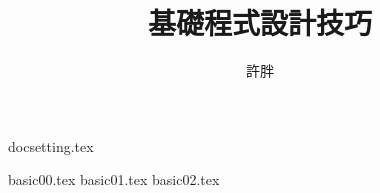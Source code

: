 \documentclass[12pt,a4paper,oneside]{article}
\begin{document}
\begin{CJK}{UTF8}{bkai}

{docsetting.tex}

\title{基礎程式設計技巧}
\author{許胖}

\begin{multicols}{2}
\tableofcontents
\end{multicols}

{basic00.tex}
{basic01.tex}
{basic02.tex}

\printindex

\clearpage
\end{CJK}
\end{document}
